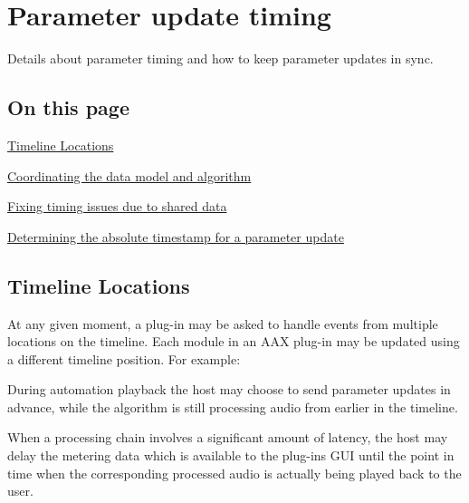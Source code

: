 \hypertarget{a00351}{}\section{Parameter update timing}
\label{a00351}
Details about parameter timing and how to keep parameter updates in sync. 

\hypertarget{a00351_parameterUpdateTiming_contents}{}\subsection{On this page}\label{a00351_parameterUpdateTiming_contents}
\begin{DoxyItemize}
\item \hyperlink{a00351_parameterUpdateTiming_timelineLocations}{Timeline Locations} \item \hyperlink{a00351_parameterUpdateTiming_synchronization}{Coordinating the data model and algorithm} \item \hyperlink{a00351_parameterUpdateTiming_sharedData}{Fixing timing issues due to shared data} \item \hyperlink{a00351_parameterUpdateTiming_timestamps}{Determining the absolute timestamp for a parameter update}\end{DoxyItemize}
\hypertarget{a00351_parameterUpdateTiming_timelineLocations}{}\subsection{Timeline Locations}\label{a00351_parameterUpdateTiming_timelineLocations}
At any given moment, a plug-\/in may be asked to handle events from multiple locations on the timeline. Each module in an A\+A\+X plug-\/in may be updated using a different timeline position. For example\+: \begin{DoxyItemize}
\item During automation playback the host may choose to send parameter updates in advance, while the algorithm is still processing audio from earlier in the timeline. \item When a processing chain involves a significant amount of latency, the host may delay the metering data which is available to the plug-\/in\textquotesingle{}s G\+U\+I until the point in time when the corresponding processed audio is actually being played back to the user.\end{DoxyItemize}
